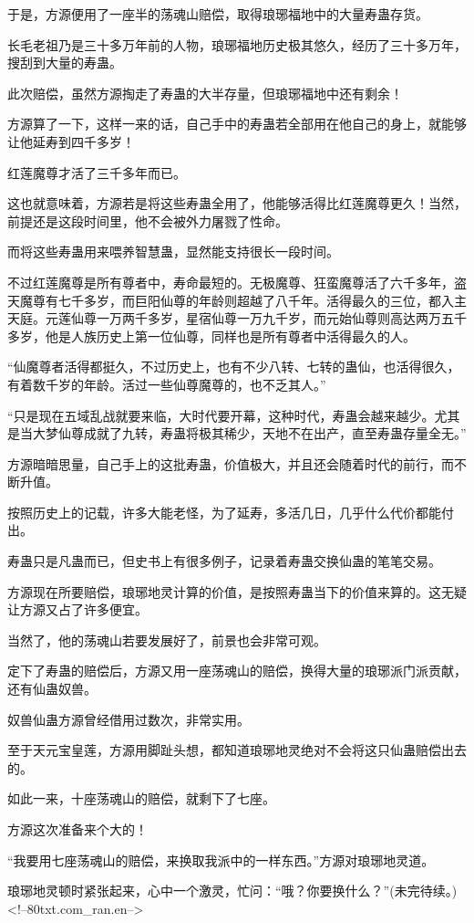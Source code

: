 \begin{this_body}
于是，方源便用了一座半的荡魂山赔偿，取得琅琊福地中的大量寿蛊存货。

长毛老祖乃是三十多万年前的人物，琅琊福地历史极其悠久，经历了三十多万年，搜刮到大量的寿蛊。

此次赔偿，虽然方源掏走了寿蛊的大半存量，但琅琊福地中还有剩余！

方源算了一下，这样一来的话，自己手中的寿蛊若全部用在他自己的身上，就能够让他延寿到四千多岁！

红莲魔尊才活了三千多年而已。

这也就意味着，方源若是将这些寿蛊全用了，他能够活得比红莲魔尊更久！当然，前提还是这段时间里，他不会被外力屠戮了性命。

而将这些寿蛊用来喂养智慧蛊，显然能支持很长一段时间。

不过红莲魔尊是所有尊者中，寿命最短的。无极魔尊、狂蛮魔尊活了六千多年，盗天魔尊有七千多岁，而巨阳仙尊的年龄则超越了八千年。活得最久的三位，都入主天庭。元莲仙尊一万两千多岁，星宿仙尊一万九千岁，而元始仙尊则高达两万五千多岁，他是人族历史上第一位仙尊，同样也是所有尊者中活得最久的人。

“仙魔尊者活得都挺久，不过历史上，也有不少八转、七转的蛊仙，也活得很久，有着数千岁的年龄。活过一些仙尊魔尊的，也不乏其人。”

“只是现在五域乱战就要来临，大时代要开幕，这种时代，寿蛊会越来越少。尤其是当大梦仙尊成就了九转，寿蛊将极其稀少，天地不在出产，直至寿蛊存量全无。”

方源暗暗思量，自己手上的这批寿蛊，价值极大，并且还会随着时代的前行，而不断升值。

按照历史上的记载，许多大能老怪，为了延寿，多活几日，几乎什么代价都能付出。

寿蛊只是凡蛊而已，但史书上有很多例子，记录着寿蛊交换仙蛊的笔笔交易。

方源现在所要赔偿，琅琊地灵计算的价值，是按照寿蛊当下的价值来算的。这无疑让方源又占了许多便宜。

当然了，他的荡魂山若要发展好了，前景也会非常可观。

定下了寿蛊的赔偿后，方源又用一座荡魂山的赔偿，换得大量的琅琊派门派贡献，还有仙蛊奴兽。

奴兽仙蛊方源曾经借用过数次，非常实用。

至于天元宝皇莲，方源用脚趾头想，都知道琅琊地灵绝对不会将这只仙蛊赔偿出去的。

如此一来，十座荡魂山的赔偿，就剩下了七座。

方源这次准备来个大的！

“我要用七座荡魂山的赔偿，来换取我派中的一样东西。”方源对琅琊地灵道。

琅琊地灵顿时紧张起来，心中一个激灵，忙问：“哦？你要换什么？”(未完待续。)<!--80txt.com\_ran.en-->

\end{this_body}

